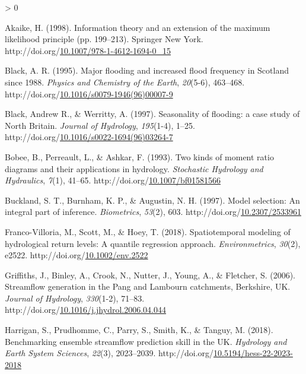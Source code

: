 \documentclass[12pt,oneside]{reedthesis}
\newlength{\cslhangindent}
\newenvironment{CSLReferences}[2] %
 {%
  \setlength{\parindent}{0pt}
  \ifodd #1 \everypar{\setlength{\hangindent}{\cslhangindent}}\ignorespaces\fi
  \ifnum #2 > 0
  \setlength{\parskip}{#2\baselineskip}
  \fi
 }%
 {}
\begin{document}
\setlength{\parindent}{-0.20in}

\hypertarget{refs}{}
\begin{CSLReferences}{1}{0}
\leavevmode\hypertarget{ref-akaike1998}{}%
Akaike, H. (1998). Information theory and an extension of the maximum likelihood principle (pp. 199--213). Springer New York. http://doi.org/\href{https://doi.org/10.1007/978-1-4612-1694-0_15}{10.1007/978-1-4612-1694-0\_15}

\leavevmode\hypertarget{ref-black1995}{}%
Black, A. R. (1995). Major flooding and increased flood frequency in Scotland since 1988. \emph{Physics and Chemistry of the Earth}, \emph{20}(5-6), 463--468. http://doi.org/\href{https://doi.org/10.1016/s0079-1946(96)00007-9}{10.1016/s0079-1946(96)00007-9}

\leavevmode\hypertarget{ref-black1997}{}%
Black, Andrew R., \& Werritty, A. (1997). Seasonality of flooding: a case study of North Britain. \emph{Journal of Hydrology}, \emph{195}(1-4), 1--25. http://doi.org/\href{https://doi.org/10.1016/s0022-1694(96)03264-7}{10.1016/s0022-1694(96)03264-7}

\leavevmode\hypertarget{ref-bobee1993}{}%
Bobee, B., Perreault, L., \& Ashkar, F. (1993). Two kinds of moment ratio diagrams and their applications in hydrology. \emph{Stochastic Hydrology and Hydraulics}, \emph{7}(1), 41--65. http://doi.org/\href{https://doi.org/10.1007/bf01581566}{10.1007/bf01581566}

\leavevmode\hypertarget{ref-buckland1997}{}%
Buckland, S. T., Burnham, K. P., \& Augustin, N. H. (1997). Model selection: An integral part of inference. \emph{Biometrics}, \emph{53}(2), 603. http://doi.org/\href{https://doi.org/10.2307/2533961}{10.2307/2533961}

\leavevmode\hypertarget{ref-franco-villoria2018}{}%
Franco-Villoria, M., Scott, M., \& Hoey, T. (2018). Spatiotemporal modeling of hydrological return levels: A quantile regression approach. \emph{Environmetrics}, \emph{30}(2), e2522. http://doi.org/\href{https://doi.org/10.1002/env.2522}{10.1002/env.2522}

\leavevmode\hypertarget{ref-griffiths2006}{}%
Griffiths, J., Binley, A., Crook, N., Nutter, J., Young, A., \& Fletcher, S. (2006). Streamflow generation in the Pang and Lambourn catchments, Berkshire, UK. \emph{Journal of Hydrology}, \emph{330}(1-2), 71--83. http://doi.org/\href{https://doi.org/10.1016/j.jhydrol.2006.04.044}{10.1016/j.jhydrol.2006.04.044}

\leavevmode\hypertarget{ref-harrigan2018}{}%
Harrigan, S., Prudhomme, C., Parry, S., Smith, K., \& Tanguy, M. (2018). Benchmarking ensemble streamflow prediction skill in the UK. \emph{Hydrology and Earth System Sciences}, \emph{22}(3), 2023--2039. http://doi.org/\href{https://doi.org/10.5194/hess-22-2023-2018}{10.5194/hess-22-2023-2018}


\end{CSLReferences}
\end{document}
